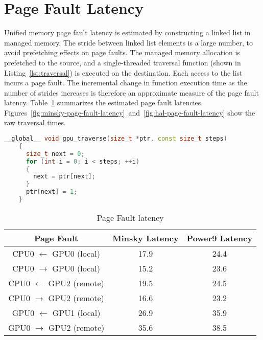 \section{Page Fault Latency}

Unified memory page fault latency is estimated by constructing a linked list in managed memory.
The stride between linked list elements is a large number, to avoid prefetching effects on page faults.
The managed memory allocation is prefetched to the source, and a single-threaded traversal function (shown in Listing~\ref{lst:traversal}) is executed on the destination.
Each access to the list incurs a page fault.
The incremental change in function execution time as the number of strides increases is therefore an approximate measure of the page fault latency.
Table~\ref{tab:page-fault-latency} summarizes the estimated page fault latencies.
Figures~\ref{fig:minsky-page-fault-latency}~and~\ref{fig:hal-page-fault-latency} show the raw traversal times.

\begin{lstlisting}[language=c++, caption=Linked List Traversal, label=lst:traversal]
    __global__ void gpu_traverse(size_t *ptr, const size_t steps)
    {
      size_t next = 0;
      for (int i = 0; i < steps; ++i)
      {
        next = ptr[next];
      }
      ptr[next] = 1;
    }
\end{lstlisting}
    

\begin{table}[h]
	\centering
	\caption[]{Page Fault latency}
	\label{tab:page-fault-latency}
	\begin{tabular}{|c|c|c|}
		\hline
		\textbf{Page Fault} & \textbf{Minsky Latency} & \textbf{Power9 Latency} \\ \hline
		CPU0 $\leftarrow$ GPU0  (local) & 17.9 & 24.4   \\ \hline
        CPU0 $\rightarrow$ GPU0 (local) & 15.2 & 23.6  \\ \hline
        CPU0 $\leftarrow$ GPU2  (remote) & 19.5 & 24.5   \\ \hline
        CPU0 $\rightarrow$ GPU2 (remote) & 16.6 & 23.2  \\ \hline
        GPU0 $\leftarrow$ GPU1  (local) & 26.9 & 35.9   \\ \hline
		GPU0 $\rightarrow$ GPU2 (remote) & 35.6 & 38.5  \\ \hline
	\end{tabular}
\end{table}


